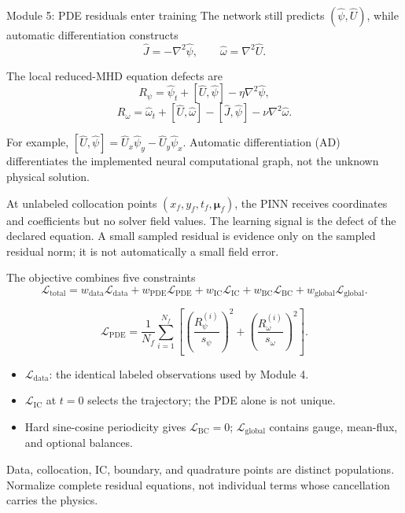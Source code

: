 \documentclass[aspectratio=169,11pt]{beamer}
\newcommand{\bracket}[2]{\left[#1,#2\right]}
\newcommand{\Rpsi}{R_{\psi}}
\newcommand{\Romega}{R_{\omega}}
\newcommand{\vect}[1]{\bm{#1}}
\newcommand{\currentmodule}{Module 1}
\newcommand{\moduleprogress}{1 of 6}
\newcommand{\setmodule}[2]{%
  \renewcommand{\currentmodule}{#1}%
  \renewcommand{\moduleprogress}{#2}%
}
\begin{document}
\setmodule{Module 5}{1 of 5}
\begin{frame}{Module 5: PDE residuals enter training}
The network still predicts $(\widehat\psi,\widehat U)$, while automatic differentiation constructs
\[
\widehat J=-\nabla^2\widehat\psi,
\qquad
\widehat\omega=\nabla^2\widehat U.
\]

The local reduced-MHD equation defects are
\[
\boxed{
\Rpsi
=\widehat\psi_t
+\bracket{\widehat U}{\widehat\psi}
-\eta\nabla^2\widehat\psi,}
\]
\[
\boxed{
\Romega
=\widehat\omega_t
+\bracket{\widehat U}{\widehat\omega}
-\bracket{\widehat J}{\widehat\psi}
-\nu\nabla^2\widehat\omega.}
\]

For example, $\bracket{\widehat U}{\widehat\psi}=\widehat U_x\widehat\psi_y-\widehat U_y\widehat\psi_x$.  Automatic differentiation (AD) differentiates the implemented neural computational graph, not the unknown physical solution.

At unlabeled collocation points $(x_f,y_f,t_f,\vect\mu_f)$, the PINN receives coordinates and coefficients but no solver field values.  The learning signal is the defect of the declared equation.  A small sampled residual is evidence only on the sampled residual norm; it is not automatically a small field error.
\end{frame}

\setmodule{Module 5}{2 of 5}
\begin{frame}{The objective combines five constraints}
\[
\boxed{
\mathcal L_{\mathrm{total}}
=w_{\mathrm{data}}\mathcal L_{\mathrm{data}}
+w_{\mathrm{PDE}}\mathcal L_{\mathrm{PDE}}
+w_{\mathrm{IC}}\mathcal L_{\mathrm{IC}}
+w_{\mathrm{BC}}\mathcal L_{\mathrm{BC}}
+w_{\mathrm{global}}\mathcal L_{\mathrm{global}}.}
\]

\[
\mathcal L_{\mathrm{PDE}}
=\frac{1}{N_f}\sum_{i=1}^{N_f}
\left[
\left(\frac{\Rpsi^{(i)}}{s_\psi}\right)^2
+\left(\frac{\Romega^{(i)}}{s_\omega}\right)^2
\right].
\]

\begin{itemize}
  \item $\mathcal L_{\mathrm{data}}$: the identical labeled observations used by Module 4.
  \item $\mathcal L_{\mathrm{IC}}$ at $t=0$ selects the trajectory; the PDE alone is not unique.
  \item Hard sine-cosine periodicity gives $\mathcal L_{\mathrm{BC}}=0$; $\mathcal L_{\mathrm{global}}$ contains gauge, mean-flux, and optional balances.
\end{itemize}
Data, collocation, IC, boundary, and quadrature points are distinct populations. Normalize complete residual equations, not individual terms whose cancellation carries the physics.
\end{frame}
\end{document}
